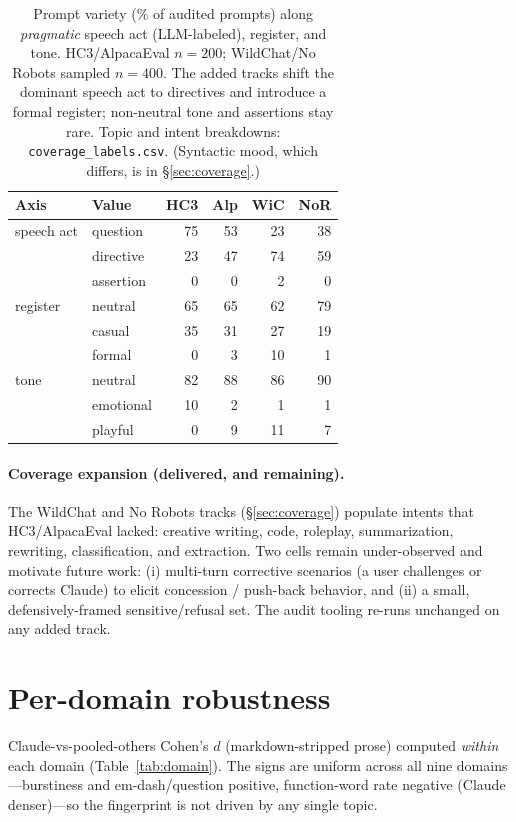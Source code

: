 \documentclass[11pt]{article}
\begin{document}
\begin{table}[t]
\centering\small
\setlength{\tabcolsep}{4pt}
\begin{tabular}{@{}llrrrr@{}}
\toprule
Axis & Value & HC3 & Alp & WiC & NoR \\
\midrule
speech act & question & 75 & 53 & 23 & 38 \\
 & directive & 23 & 47 & 74 & 59 \\
 & assertion & 0 & 0 & 2 & 0 \\
register & neutral & 65 & 65 & 62 & 79 \\
 & casual & 35 & 31 & 27 & 19 \\
 & formal & 0 & 3 & 10 & 1 \\
tone & neutral & 82 & 88 & 86 & 90 \\
 & emotional & 10 & 2 & 1 & 1 \\
 & playful & 0 & 9 & 11 & 7 \\
\bottomrule
\end{tabular}
\caption{Prompt variety (\% of audited prompts) along \emph{pragmatic} speech act
(LLM-labeled), register, and tone. HC3/AlpacaEval $n{=}200$; WildChat/No Robots
sampled $n{=}400$. The added tracks shift the dominant speech act to directives
and introduce a formal register; non-neutral tone and assertions stay rare. Topic
and intent breakdowns: \texttt{coverage\_labels.csv}. (Syntactic mood, which
differs, is in \S\ref{sec:coverage}.)}
\label{tab:variety}
\end{table}

\paragraph{Coverage expansion (delivered, and remaining).} The WildChat and No
Robots tracks (\S\ref{sec:coverage}) populate intents that HC3/AlpacaEval lacked:
creative writing, code, roleplay, summarization, rewriting, classification, and
extraction. Two cells remain under-observed and motivate future work: (i)
multi-turn corrective scenarios (a user challenges or corrects Claude) to elicit
concession / push-back behavior, and (ii) a small, defensively-framed
sensitive/refusal set. The audit tooling re-runs unchanged on any added track.

\section{Per-domain robustness}
\label{app:domain}
Claude-vs-pooled-others Cohen's $d$ (markdown-stripped prose) computed
\emph{within} each domain (Table~\ref{tab:domain}). The signs are uniform across
all nine domains---burstiness and em-dash/question positive, function-word rate
negative (Claude denser)---so the fingerprint is not driven by any single topic.
\end{document}
